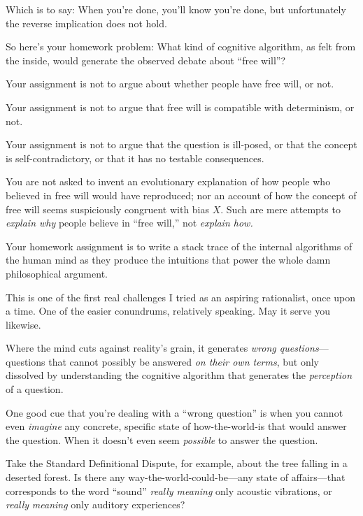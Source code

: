{
 Which is to say: When you're done,
you'll know you're done, but
unfortunately the reverse implication does not hold.}

{
 So here's your homework problem: What kind of
cognitive algorithm, as felt from the inside, would generate the
observed debate about ``free
will''?}

{
 Your assignment is not to argue about whether people have free
will, or not.}

{
 Your assignment is not to argue that free will is compatible with
determinism, or not.}

{
 Your assignment is not to argue that the question is ill-posed, or
that the concept is self-contradictory, or that it has no testable
consequences.}

{
 You are not asked to invent an evolutionary explanation of how
people who believed in free will would have reproduced; nor an account
of how the concept of free will seems suspiciously congruent with bias
$X$. Such are mere attempts to \textit{explain why} people believe in
``free will,'' not \textit{explain
how.}}

{
 Your homework assignment is to write a stack trace of the internal
algorithms of the human mind as they produce the intuitions that power
the whole damn philosophical argument.}

{
 This is one of the first real challenges I tried as an aspiring
rationalist, once upon a time. One of the easier conundrums, relatively
speaking. May it serve you likewise.}

\myendsectiontext



{
 Where the mind cuts against reality's grain, it
generates \textit{wrong questions}{}---questions that cannot possibly
be answered \textit{on their own terms}, but only dissolved by
understanding the cognitive algorithm that generates the
\textit{perception} of a question. }

{
 One good cue that you're dealing with a
``wrong question'' is when you
cannot even \textit{imagine} any concrete, specific state of
how-the-world-is that would answer the question. When it
doesn't even seem \textit{possible} to answer the
question.}

{
 Take the Standard Definitional Dispute, for example, about the
tree falling in a deserted forest. Is there any
way-the-world-could-be---any state of affairs---that corresponds to the
word ``sound'' \textit{really
meaning} only acoustic vibrations, or \textit{really} \textit{meaning}
only auditory experiences?}

